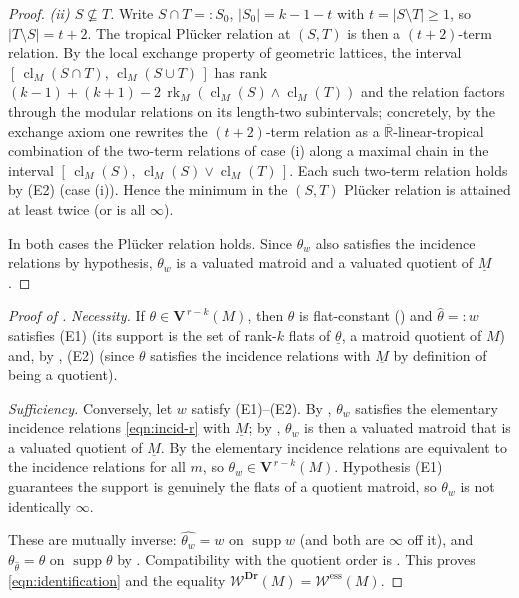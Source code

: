 \documentclass{article}
\theoremstyle{definition}
\newcommand{\Rbar}{\overline{\mathbb{R}}}
\newcommand{\rk}{\operatorname{rk}}
\newcommand{\cl}{\operatorname{cl}}
\newcommand{\Dr}{\mathbf{Dr}}
\newcommand{\bV}{\mathbf V}
\newcommand{\cW}{\mathcal{W}}
\begin{document}
\begin{proof}
\emph{(ii) $S\not\subseteq T$.} Write $S\cap T=:S_0$, $|S_0|=k-1-t$ with $t=|S\setminus T|\ge1$, so
$|T\setminus S|=t+2$. The tropical Pl\"ucker relation at $(S,T)$ is then a $(t+2)$-term relation.
By the local exchange property of geometric lattices, the interval
$[\,\cl_M(S\cap T),\,\cl_M(S\cup T)\,]$ has rank $(k-1)+(k+1)-2\,\rk_M(\cl_M(S)\wedge\cl_M(T))$ and
the relation factors through the modular relations on its length-two subintervals; concretely, by the
exchange axiom one rewrites the $(t+2)$-term relation as a $\Rbar$-linear-tropical combination of
the two-term relations of case (i) along a maximal chain in the interval
$[\,\cl_M(S),\,\cl_M(S)\vee\cl_M(T)\,]$. Each such two-term relation holds by (E2) (case (i)). Hence
the minimum in the $(S,T)$ Pl\"ucker relation is attained at least twice (or is all $\infty$).

In both cases the Pl\"ucker relation holds. Since $\theta_w$ also satisfies the incidence relations
by hypothesis, $\theta_w$ is a valuated matroid and a valuated quotient of $\underline M$.
\end{proof}

\begin{proof}[Proof of ]
\emph{Necessity.} If $\theta\in\bV^{\,r-k}(M)$, then $\theta$ is flat-constant
() and $\widehat\theta=:w$ satisfies (E1) (its support is the set of rank-$k$
flats of $\underline\theta$, a matroid quotient of $M$) and, by , (E2) (since
$\theta$ satisfies the incidence relations with $\underline M$ by definition of being a quotient).

\emph{Sufficiency.} Conversely, let $w$ satisfy (E1)--(E2). By , $\theta_w$
satisfies the elementary incidence relations \eqref{eqn:incid-r} with $\underline M$; by
, $\theta_w$ is then a valuated matroid that is a valuated quotient of
$\underline M$. By  the elementary incidence relations are equivalent to the
incidence relations for all $m$, so $\theta_w\in\bV^{\,r-k}(M)$. Hypothesis (E1) guarantees the
support is genuinely the flats of a quotient matroid, so $\theta_w$ is not identically $\infty$.

These are mutually inverse: $\widehat{\theta_w}=w$ on $\operatorname{supp}w$ (and both are $\infty$
off it), and $\theta_{\widehat\theta}=\theta$ on $\operatorname{supp}\theta$ by
. Compatibility with the quotient order is . This proves
\eqref{eqn:identification} and the equality $\cW^{\Dr}(M)=\cW^{\mathrm{ess}}(M)$.
\end{proof}
\end{document}
